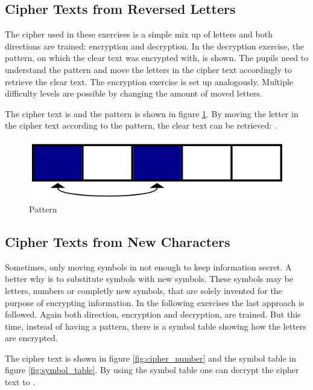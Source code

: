 \subsection{Cipher Texts from Reversed Letters}

The cipher used in these exercises is a simple mix up of letters and both directions are trained: encryption and decryption. In the decryption exercise, the pattern, on which the clear text was encrypted with, is shown. The pupils need to understand the pattern and move the letters in the cipher text accordingly to retrieve the clear text. The encryption exercise is set up analogously. Multiple difficulty levels are possible by changing the amount of moved letters.

\begin{example}
    The cipher text is  and the pattern is shown in figure \ref{fig:pattern}. By moving the letter in the cipher text according to the pattern, the clear text can be retrieved: .
\end{example}

\begin{figure} 
    \centering
    \includegraphics[width=0.4 \columnwidth]{figures/pattern.png}
    \caption{Pattern} 
    \label{fig:pattern} 
\end{figure}

\subsection{Cipher Texts from New Characters}

Sometimes, only moving symbols in not enough to keep information secret. A better why is to substitute symbols with new symbols. These symbols may be letters, numbers or completly new symbols, that are solely invented for the purpose of encrypting information.
In the following exercises the last approach is followed. Again both direction, encryption and decryption, are trained. But this time, instead of having a pattern, there is a symbol table showing how the letters are encrypted. 

\begin{example}
    The cipher text is shown in figure \ref{fig:cipher_number} and the symbol table in figure \ref{fig:symbol_table}. By using the symbol table one can decrypt the cipher text to .
\end{example}

